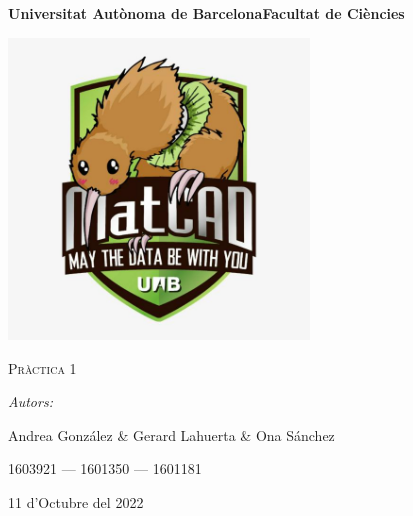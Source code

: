 \documentclass[a4paper, 11pt]{article}
\begin{document}
\begin{titlepage}
    \centering
    {\bfseries\LARGE \hspace{1.9em} Universitat Autònoma de Barcelona\newline Facultat de Ciències\par}
    \vspace{2cm}
    {\hspace{-1em}\includegraphics[width=0.6\textwidth]{MatCAD3.jpg}\par}
    \vspace{1cm}
    {\scshape\Huge Pràctica 1\par} 
    \vspace{1cm}
    {\Large \itshape Autors: \par}
    \vspace{0.5cm}
    {\Large Andrea González \& Gerard Lahuerta \& Ona Sánchez \par}
    \vspace{0.5cm}
    {\Large 1603921 --- 1601350 --- 1601181 \par}
    \vspace{1cm}
    {\Large 11 d'Octubre del 2022\par}
\end{titlepage}

\justifying

\newpage
{
\small
\setcounter{page}{2}
\pagestyle{plain}
\tableofcontents
\cleardoublepage
{}
}
\newpage
\end{document}
